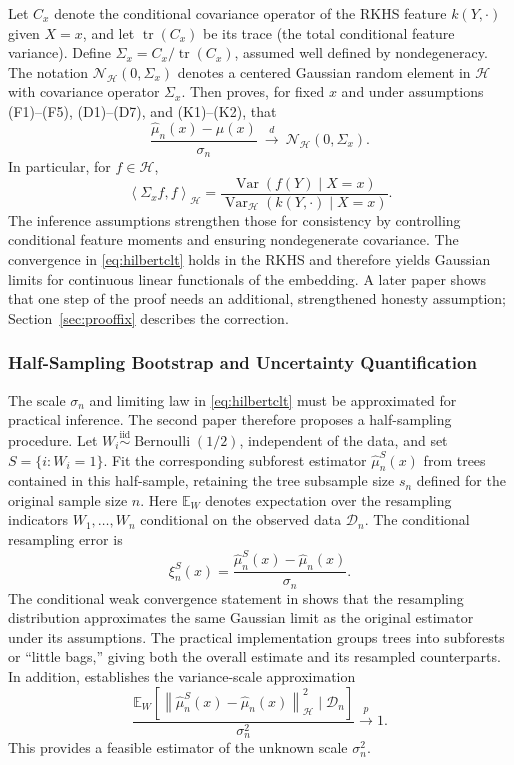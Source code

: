 \documentclass[12pt,a4paper]{article}
\newcommand{\E}{\mathbb E}
\newcommand{\calH}{\mathcal H}
\newcommand{\Var}{\operatorname{Var}}
\newcommand{\1}{\mathbf 1}
\newcommand{\norm}[1]{\left\lVert#1\right\rVert}
\newcommand{\ip}[2]{\left\langle#1,#2\right\rangle}
\begin{document}
Let $C_x$ denote the conditional covariance operator of the RKHS feature $k(Y,\cdot)$ given $X=x$, and let $\operatorname{tr}(C_x)$ be its trace (the total conditional feature variance). Define $\Sigma_x=C_x/\operatorname{tr}(C_x)$, assumed well defined by nondegeneracy. The notation $\mathcal N_{\calH}(0,\Sigma_x)$ denotes a centered Gaussian random element in $\calH$ with covariance operator $\Sigma_x$. Then \cite[Theorem~6]{naf2023} proves, for fixed $x$ and under assumptions (F1)--(F5), (D1)--(D7), and (K1)--(K2), that
\begin{equation}\label{eq:hilbertclt}
 \frac{\widehat\mu_n(x)-\mu(x)}{\sigma_n}
 \ \xrightarrow{\,d\,}\ \mathcal N_{\calH}(0,\Sigma_x).
\end{equation}
In particular, for $f\in\calH$,
\begin{equation}\label{eq:covop}
 \ip{\Sigma_x f}{f}_{\calH}
 =\frac{\Var(f(Y)\mid X=x)}{\Var_{\calH}(k(Y,\cdot)\mid X=x)}.
\end{equation}
The inference assumptions strengthen those for consistency by controlling conditional feature moments and ensuring nondegenerate covariance. The convergence in \eqref{eq:hilbertclt} holds in the RKHS and therefore yields Gaussian limits for continuous linear functionals of the embedding. A later paper shows that one step of the proof needs an additional, strengthened honesty assumption; Section~\ref{sec:prooffix} describes the correction.

\subsubsection{Half-Sampling Bootstrap and Uncertainty Quantification}
The scale $\sigma_n$ and limiting law in \eqref{eq:hilbertclt} must be approximated for practical inference. The second paper therefore proposes a half-sampling procedure. Let $W_i\overset{\mathrm{iid}}\sim\operatorname{Bernoulli}(1/2)$, independent of the data, and set $S=\{i:W_i=1\}$. Fit the corresponding subforest estimator $\widehat\mu_n^S(x)$ from trees contained in this half-sample, retaining the tree subsample size $s_n$ defined for the original sample size $n$. Here $\E_W$ denotes expectation over the resampling indicators $W_1,\ldots,W_n$ conditional on the observed data $\mathcal D_n$. The conditional resampling error is
\begin{equation}\label{eq:half}
 \xi_n^S(x)=\frac{\widehat\mu_n^S(x)-\widehat\mu_n(x)}{\sigma_n}.
\end{equation}
The conditional weak convergence statement in \cite[Theorem~7]{naf2023} shows that the resampling distribution approximates the same Gaussian limit as the original estimator under its assumptions. The practical implementation groups trees into subforests or ``little bags,'' giving both the overall estimate and its resampled counterparts. In addition, \cite[Corollary~9]{naf2023} establishes the variance-scale approximation
\begin{equation}\label{eq:halfvariance}
 \frac{\E_W\!\left[
    \norm{\widehat\mu_n^S(x)-\widehat\mu_n(x)}_{\calH}^2
    \mid \mathcal D_n\right]}{\sigma_n^2}
 \xrightarrow{p}1.
\end{equation}
This provides a feasible estimator of the unknown scale $\sigma_n^2$.
\end{document}

